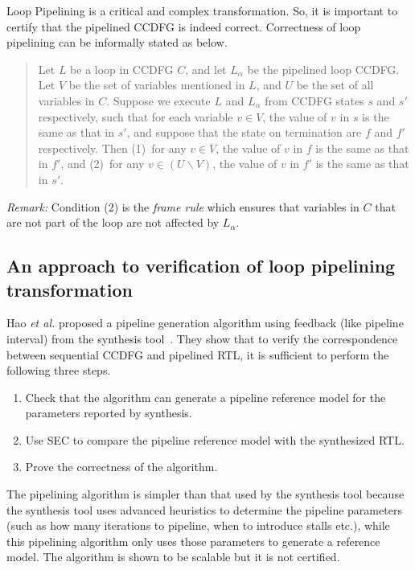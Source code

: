 Loop Pipelining is a critical and complex transformation. So, it is important to certify that the pipelined CCDFG is indeed correct. Correctness of loop pipelining 
can be informally stated as below.

\begin{quote}
Let $L$ be a loop in CCDFG $C$, and let $L_{\alpha}$ be the
pipelined loop CCDFG. Let $V$ be the set of
variables mentioned in $L$, and $U$ be the set of all
variables in $C$.  Suppose we execute $L$ and $L_{\alpha}$
from CCDFG states $s$ and $s'$ respectively, such that for
each variable $v\in V$, the value of $v$ in $s$ is the same
as that in $s'$, and suppose that the state on termination
are $f$ and $f'$ respectively.  Then (1)~for any $v\in V$,
the value of $v$ in $f$ is the same as that in $f'$, and
(2)~for any $v\in(U\backslash V)$, the value of $v$ in $f'$
is the same as that in $s'$.
\end{quote}
\noindent
{\em Remark:} Condition (2) is the {\em frame rule} which
ensures that variables in $C$ that are not part of the loop
are not affected by $L_{\alpha}$.

\subsection{An approach to verification of loop pipelining transformation}
\label{subsec:hao-approach}

Hao {\em et al.} proposed a pipeline generation algorithm using feedback (like pipeline interval) from the synthesis tool~\cite{hrx:dac-12}. They show that to verify the correspondence between sequential CCDFG and pipelined RTL, it is sufficient to perform the following three steps. 
\begin{enumerate} 
\item Check that the algorithm can generate a pipeline reference model for the parameters reported by synthesis.
\item Use SEC to compare the pipeline reference model with the
synthesized RTL.
\item Prove the correctness of the algorithm. 
\end{enumerate}

The pipelining algorithm is simpler than that used by the synthesis tool because the synthesis tool uses advanced heuristics to determine the pipeline parameters 
(such as how many iterations to pipeline, when to introduce stalls etc.), while this pipelining algorithm only uses those parameters to generate a reference model. The algorithm is shown to be scalable but it is not certified. 

